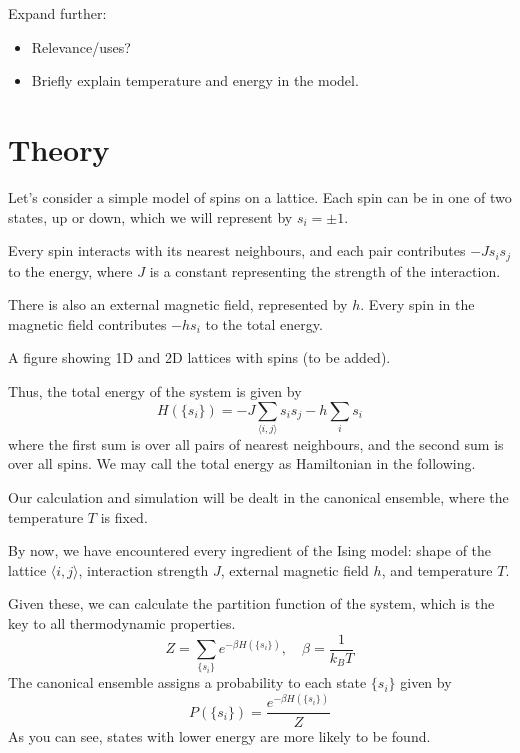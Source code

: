 \documentclass[11pt]{article}
\begin{document}
	Expand further:
	\begin{itemize}
		\item Relevance/uses?
		\item Briefly explain temperature and energy in the model.
	\end{itemize}
	
	\section{Theory}

	Let's consider a simple model of spins on a lattice.
	Each spin can be in one of two states, up or down, which we will represent by $s_i = \pm 1$.

	Every spin interacts with its nearest neighbours, and each pair contributes $-J s_i s_j$ to the energy, 
	where $J$ is a constant representing the strength of the interaction.

	There is also an external magnetic field, represented by $h$.
	Every spin in the magnetic field contributes $-h s_i$ to the total energy.

	A figure showing 1D and 2D lattices with spins (to be added).

	Thus, the total energy of the system is given by
	\begin{equation} \label{eq:Hamiltonian}
		H(\{s_i\}) = -J \sum_{\langle i,j \rangle} s_i s_j - h \sum_i s_i
	\end{equation}
	where the first sum is over all pairs of nearest neighbours, and the second sum is over all spins.
	We may call the total energy as Hamiltonian in the following.
	
	Our calculation and simulation will be dealt in the canonical ensemble, where the temperature $T$ is fixed.

	By now, we have encountered every ingredient of the Ising model: 
	shape of the lattice $\langle i,j \rangle$, interaction strength $J$, external magnetic field $h$, and temperature $T$.
	
	Given these, we can calculate the partition function of the system, which is the key to all thermodynamic properties.
	\begin{equation} \label{eq:PartitionFunction}
		Z = \sum_{\{s_i\}} e^{-\beta H(\{s_i\})}, \quad \beta = \frac{1}{k_B T}
	\end{equation}
	The canonical ensemble assigns a probability to each state $\{s_i\}$ given by
	\begin{equation} \label{eq:Probability}
		P(\{s_i\}) = \frac{e^{-\beta H(\{s_i\})}}{Z}
	\end{equation}
	As you can see, states with lower energy are more likely to be found.
\end{document}
